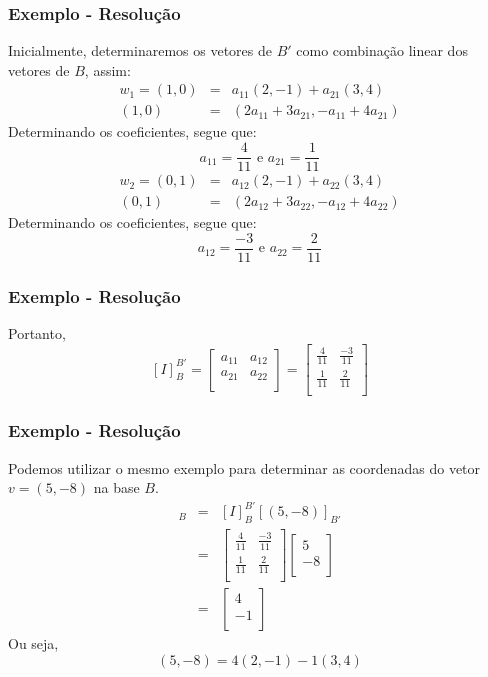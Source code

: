 \documentclass[hyperref={pdfpagelabels=false}]{beamer}
\begin{document}
\begin{frame}
	\frametitle{Exemplo - Resolução}
	
	Inicialmente, determinaremos os vetores de $B'$ como combinação linear dos vetores de $B$, assim:
	\begin{eqnarray*}
		w_1 = (1,0) & = & a_{11}(2,-1) + a_{21}(3,4) \\
		(1,0) & = & (2a_{11} + 3a_{21}, -a_{11} + 4a_{21})
	\end{eqnarray*}
	Determinando os coeficientes, segue que:
	$$a_{11} = \frac{4}{11} \text{ e } a_{21} = \frac{1}{11}$$
	\begin{eqnarray*}
		w_2 = (0,1) & = & a_{12}(2,-1) + a_{22}(3,4) \\
		(0,1) & = & (2a_{12} + 3a_{22}, -a_{12} + 4a_{22})
	\end{eqnarray*}
	Determinando os coeficientes, segue que:
	$$a_{12} = \frac{-3}{11} \text{ e } a_{22} = \frac{2}{11}$$
	
\end{frame}

\begin{frame}
	\frametitle{Exemplo - Resolução}
	
	Portanto,
	$$[I]_{B}^{B'} = \left[ \begin{array}{cc}
	a_{11}  &  a_{12}  \\
	a_{21}  &  a_{22} \\
	\end{array}\right]
	=
	\left[ \begin{array}{cc}
	\frac{4}{11}  &  \frac{-3}{11}  \\
	\frac{1}{11}  &  \frac{2}{11} \\
	\end{array}\right]$$
	
\end{frame}

\begin{frame}
	\frametitle{Exemplo - Resolução}
	
	Podemos utilizar o mesmo exemplo para determinar as coordenadas do vetor $v = (5,-8)$ na base $B$.
	\begin{eqnarray*}
		[(5,-8)]_{B} & = & [I]_{B}^{B'}[(5,-8)]_{B'} \\
		& = & \left[ \begin{array}{cc}
			\frac{4}{11}  &  \frac{-3}{11}  \\
			\frac{1}{11}  &  \frac{2}{11} \\
		\end{array}\right] 
		\left[\begin{array}{c}
			5 \\
			-8 \\
		\end{array}\right]\\
		& = & 
		\left[\begin{array}{c}
			4 \\
			-1 \\
		\end{array}\right]
	\end{eqnarray*}
	Ou seja,
	$$(5,-8) = 4(2,-1) -1(3,4)$$
	
\end{frame}
\end{document}
